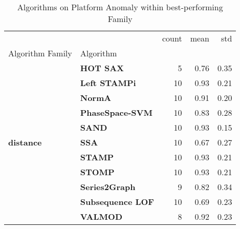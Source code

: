 \begin{table}[h]
\centering
\caption{Algorithms on Platform Anomaly within best-performing Family}
\label{tab:bp-platform}
\begin{tabular}{llrrr}
\toprule
 &  & count & mean & std \\
Algorithm Family & Algorithm &  &  &  \\
\midrule
\multirow[t]{11}{*}{\textbf{distance}} & \textbf{HOT SAX} & 5 & 0.76 & 0.35 \\
\textbf{} & \textbf{Left STAMPi} & 10 & 0.93 & 0.21 \\
\textbf{} & \textbf{NormA} & 10 & 0.91 & 0.20 \\
\textbf{} & \textbf{PhaseSpace-SVM} & 10 & 0.83 & 0.28 \\
\textbf{} & \textbf{SAND} & 10 & 0.93 & 0.15 \\
\textbf{} & \textbf{SSA} & 10 & 0.67 & 0.27 \\
\textbf{} & \textbf{STAMP} & 10 & 0.93 & 0.21 \\
\textbf{} & \textbf{STOMP} & 10 & 0.93 & 0.21 \\
\textbf{} & \textbf{Series2Graph} & 9 & 0.82 & 0.34 \\
\textbf{} & \textbf{Subsequence LOF} & 10 & 0.69 & 0.23 \\
\textbf{} & \textbf{VALMOD} & 8 & 0.92 & 0.23 \\
\cline{1-5}
\bottomrule
\end{tabular}
\end{table}
